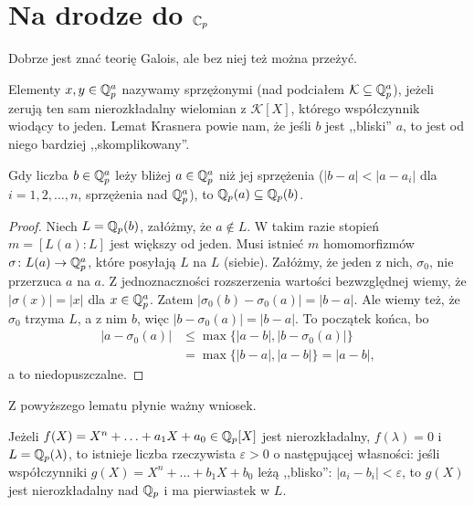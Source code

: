 \section{Na drodze do $\mathbb C_p$}
Dobrze  jest znać teorię Galois, ale bez niej też można przeżyć.

Elementy $x, y \in \mathbb Q_p^a$ nazywamy {sprzężonymi} (nad podciałem $\mathcal K \subseteq \mathbb Q_p^a$), jeżeli zerują ten sam nierozkładalny wielomian z $\mathcal K[X]$, którego współczynnik wiodący to jeden.
Lemat Krasnera powie nam, że jeśli $b$ jest ,,bliski'' $a$, to jest od niego bardziej ,,skomplikowany''.

\begin{twierdzenie}
	Gdy liczba $b \in \mathbb Q_p^a$ leży bliżej $a  \in \mathbb Q_p^a$ niż jej sprzężenia ($|b-a| < |a - a_i|$ dla $i = 1, 2, \dots, n$, sprzężenia nad $\mathbb Q_p^a$), to $\mathbb Q_p(a) \subseteq \mathbb Q_p(b)$.
\end{twierdzenie}

\begin{proof}
	Niech $L = \mathbb Q_p(b)$, załóżmy, że $a \not \in L$.
	W takim razie stopień $m = [L(a) : L]$ jest większy od jeden.
	Musi istnieć $m$ homomorfizmów $\sigma \colon L(a) \to \mathbb Q_p^a$, które posyłają $L$ na $L$ (siebie).
	Załóżmy, że jeden z nich, $\sigma_0$, nie przerzuca $a$ na $a$.
	Z jednoznaczności rozszerzenia wartości bezwzględnej wiemy, że $|\sigma(x)| = |x|$ dla $x \in \mathbb Q_p^a$.
	Zatem $|\sigma_0(b) - \sigma_0(a) | = |b-a|$. Ale wiemy też, że $\sigma_0$ trzyma $L$, a z nim $b$, więc $|b - \sigma_0(a)| = |b-a|$.
	To początek końca, bo
	\begin{align*}
		|a - \sigma_0(a)| & \le \max \{|a-b|, |b-\sigma_0(a)|\}\\
		& = \max \{|b-a|, |a-b|\}= |a-b|,
	\end{align*}
	a to niedopuszczalne.
\end{proof}

Z powyższego lematu płynie ważny wniosek.

\begin{fakt}\label{satis}
	Jeżeli $f(X) = X^n + \ldots + a_1 X + a_0 \in \mathbb Q_p[X]$ jest nierozkładalny, $f(\lambda) = 0$ i $L = \mathbb Q_p(\lambda)$, to istnieje liczba rzeczywista $\varepsilon > 0$ o następującej własności: jeśli współczynniki $g(X) = X^n + \ldots + b_1X + b_0$ leżą ,,blisko'': $|a_i - b_i| < \varepsilon$, to $g(X)$ jest nierozkładalny nad $\mathbb Q_p$ i ma pierwiastek w $L$.
\end{fakt}

